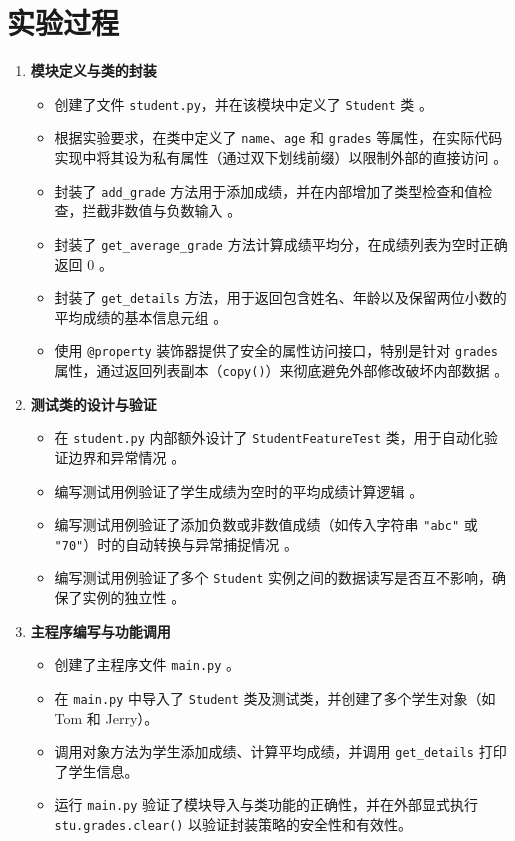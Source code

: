 \documentclass[12pt,a4paper]{ctexart}
\begin{document}
	\section{实验过程}
	\begin{enumerate}
		\item \textbf{模块定义与类的封装} 
		\begin{itemize}
			\item 创建了文件 \texttt{student.py}，并在该模块中定义了 \texttt{Student} 类 。
			\item 根据实验要求，在类中定义了 \texttt{name}、\texttt{age} 和 \texttt{grades} 等属性，在实际代码实现中将其设为私有属性（通过双下划线前缀）以限制外部的直接访问 。
			\item 封装了 \texttt{add\_grade} 方法用于添加成绩，并在内部增加了类型检查和值检查，拦截非数值与负数输入 。
			\item 封装了 \texttt{get\_average\_grade} 方法计算成绩平均分，在成绩列表为空时正确返回 0 。
			\item 封装了 \texttt{get\_details} 方法，用于返回包含姓名、年龄以及保留两位小数的平均成绩的基本信息元组 。
			\item 使用 \texttt{@property} 装饰器提供了安全的属性访问接口，特别是针对 \texttt{grades} 属性，通过返回列表副本（\texttt{copy()}）来彻底避免外部修改破坏内部数据 。
		\end{itemize}
		
		\item \textbf{测试类的设计与验证}
		\begin{itemize}
			\item 在 \texttt{student.py} 内部额外设计了 \texttt{StudentFeatureTest} 类，用于自动化验证边界和异常情况 。
			\item 编写测试用例验证了学生成绩为空时的平均成绩计算逻辑 。
			\item 编写测试用例验证了添加负数或非数值成绩（如传入字符串 \texttt{"abc"} 或 \texttt{"70"}）时的自动转换与异常捕捉情况 。
			\item 编写测试用例验证了多个 \texttt{Student} 实例之间的数据读写是否互不影响，确保了实例的独立性 。
		\end{itemize}
		
		\item \textbf{主程序编写与功能调用}
		\begin{itemize}
			\item 创建了主程序文件 \texttt{main.py} 。
			\item 在 \texttt{main.py} 中导入了 \texttt{Student} 类及测试类，并创建了多个学生对象（如 Tom 和 Jerry）。
			\item 调用对象方法为学生添加成绩、计算平均成绩，并调用 \texttt{get\_details} 打印了学生信息。
			\item 运行 \texttt{main.py} 验证了模块导入与类功能的正确性，并在外部显式执行 \texttt{stu.grades.clear()} 以验证封装策略的安全性和有效性。
		\end{itemize}
		

\end{enumerate}
\end{document}
